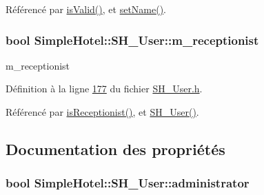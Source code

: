 Référencé par \hyperlink{classSimpleHotel_1_1SH__User_a8b60e67bc474ee97367f36d0278721ca}{is\-Valid()}, et \hyperlink{classSimpleHotel_1_1SH__User_a362a4724e0580d705ec9934407057a46}{set\-Name()}.

\hypertarget{classSimpleHotel_1_1SH__User_aeeb0dba525527d776c3dbda7551e3336}{
\subsubsection[{m\-\_\-receptionist}]{\setlength{\rightskip}{0pt plus 5cm}bool Simple\-Hotel\-::\-S\-H\-\_\-\-User\-::m\-\_\-receptionist\hspace{0.3cm}{\ttfamily [private]}}}\label{classSimpleHotel_1_1SH__User_aeeb0dba525527d776c3dbda7551e3336}


m\-\_\-receptionist 



Définition à la ligne \hyperlink{SH__User_8h_source_l00177}{177} du fichier \hyperlink{SH__User_8h_source}{S\-H\-\_\-\-User.\-h}.



Référencé par \hyperlink{classSimpleHotel_1_1SH__User_ad8921664946cd0301f4abdba71d9293e}{is\-Receptionist()}, et \hyperlink{classSimpleHotel_1_1SH__User_a17ba6e42386d48d6463cfceb92c1640c}{S\-H\-\_\-\-User()}.



\subsection{Documentation des propriétés}
\hypertarget{classSimpleHotel_1_1SH__User_a199a037f0c83fff157190e0460e2d917}{
\subsubsection[{administrator}]{\setlength{\rightskip}{0pt plus 5cm}bool Simple\-Hotel\-::\-S\-H\-\_\-\-User\-::administrator\hspace{0.3cm}{\ttfamily [read]}}}\label{classSimpleHotel_1_1SH__User_a199a037f0c83fff157190e0460e2d917}


